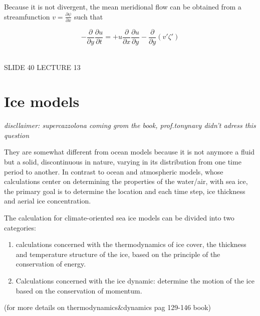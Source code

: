 Because it is not divergent, the mean meridional flow can be obtained from a
streamfunction $v = \frac{\partial \psi}{\partial x}$
such that

\begin{equation}
	- \frac{\partial}{\partial y} \frac{\partial u}{\partial t} = + u \frac{\partial}{\partial x} \frac{\partial u}{\partial y} - \frac{\partial}{\partial y} (v'\zeta')
\end{equation}



\\


SLIDE 40 LECTURE 13









\section{Ice models}
\begin{center}
	\textit{discllaimer: supercazzolona coming grom the book, prof.tonynavy didn't adress this question}
\end{center}

They are somewhat different from ocean models because it is not anymore a fluid but a solid, discontinuous in nature, varying in its distribution from one time period to another. In contrast to ocean and atmospheric models, whose calculations center on determining the properties of the water/air, with sea ice, the primary goal is to determine the location and each time step, ice thickness and aerial ice concentration.



The calculation for climate-oriented sea ice models can be divided into two categories:

\begin{enumerate}
	\item calculations concerned with the thermodynamics of ice cover, the thickness and temperature structure of the ice, based on the principle of the conservation of energy.
	\item Calculations concerned with the ice dynamic: determine the motion of the ice based on the conservation of momentum.
\end{enumerate}
(for more details on thermodynamics\&dynamics pag 129-146 book)

